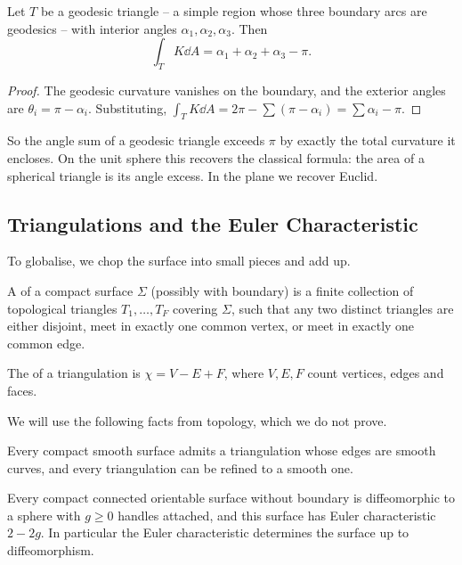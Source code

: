 \begin{corollary}
    Let $T$ be a geodesic triangle -- a simple region whose three boundary arcs are geodesics -- with interior angles $\alpha_1,\alpha_2,\alpha_3$. Then
    $$
    \int_T K \dd A = \alpha_1+\alpha_2+\alpha_3 - \pi.
    $$
\end{corollary}
\begin{proof}
    The geodesic curvature vanishes on the boundary, and the exterior angles are $\theta_i = \pi - \alpha_i$. Substituting, $\int_T K \dd A = 2\pi - \sum(\pi - \alpha_i) = \sum\alpha_i - \pi$.
\end{proof}

So the angle sum of a geodesic triangle exceeds $\pi$ by exactly the total curvature it encloses. On the unit sphere this recovers the classical formula: the area of a spherical triangle is its angle excess. In the plane we recover Euclid.

\subsection{Triangulations and the Euler Characteristic}

To globalise, we chop the surface into small pieces and add up.

\begin{definition}[Triangulation]
    A  of a compact surface $\Sigma$ (possibly with boundary) is a finite collection of topological triangles $T_1,\dots,T_F$ covering $\Sigma$, such that any two distinct triangles are either disjoint, meet in exactly one common vertex, or meet in exactly one common edge.
\end{definition}

\begin{definition}
    The  of a triangulation is $\chi = V - E + F$, where $V, E, F$ count vertices, edges and faces.
\end{definition}

We will use the following facts from topology, which we do not prove.

\begin{fact}
    Every compact smooth surface admits a triangulation whose edges are smooth curves, and every triangulation can be refined to a smooth one.
\end{fact}

\begin{fact}
    Every compact connected orientable surface without boundary is diffeomorphic to a sphere with $g \geq 0$ handles attached, and this surface has Euler characteristic $2 - 2g$. In particular the Euler characteristic determines the surface up to diffeomorphism.
\end{fact}

